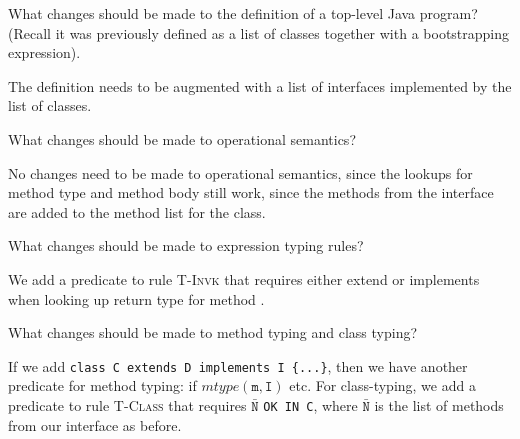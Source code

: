 \documentclass[12pt,letterpaper,twoside]{hmcpset}
\begin{document}
\begin{problem}[7.2]
 What changes should be made to the definition of a top-level Java program? (Recall it was previously defined as a list of classes together with a bootstrapping expression).
\end{problem}

\begin{solution}
 The definition needs to be augmented with a list of interfaces implemented by the list of classes.
\end{solution}


\begin{problem}[7.3]
 What changes should be made to operational semantics?
\end{problem}

\begin{solution}
 No changes need to be made to operational semantics, since the lookups for method type and method body still work, since the methods from the interface are added to the method list for the class.
\end{solution}


\begin{problem}[7.4]
 What changes should be made to expression typing rules?
\end{problem}

\begin{solution}
 We add a predicate to rule \textsc{T-Invk} that requires either  extend  or  implements  when looking up return type for method .
\end{solution}


\begin{problem}[7.5]
 What changes should be made to method typing and class typing?
\end{problem}

\begin{solution}
 If we add \verb|class C extends D implements I {...}|, then we have another predicate for method typing: if $mtype(\mathtt{m},\mathtt{I})$ etc.  For class-typing, we add a predicate to rule \textsc{T-Class} that requires $\mathtt{\bar{N}}$ \verb|OK IN C|, where $\mathtt{\bar{N}}$ is the list of methods from our interface as before.
\end{solution}
\end{document}
